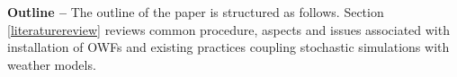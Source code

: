 \textbf{Outline --}
The outline of the paper is structured as follows. Section \ref{literaturereview} reviews common procedure, aspects and issues associated with installation of OWFs and existing practices coupling stochastic simulations with weather models.